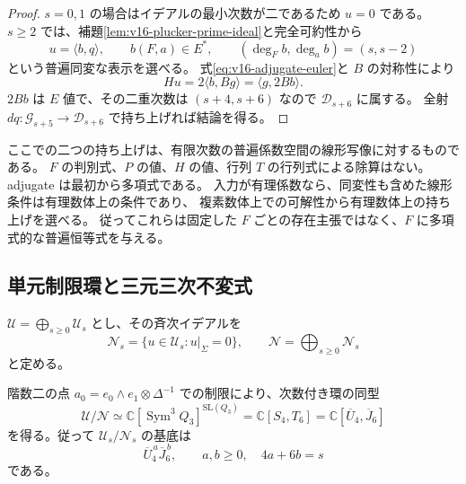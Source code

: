 \begin{proof}
$s=0,1$ の場合はイデアルの最小次数が二であるため $u=0$ である。
$s\ge2$ では、補題\ref{lem:v16-plucker-prime-ideal}と完全可約性から
\[
 u=\langle b,q\rangle,\qquad b(F,a)\in E^*,\qquad
 (\deg_Fb,\deg_ab)=(s,s-2)
\]
という普遍同変な表示を選べる。
式\eqref{eq:v16-adjugate-euler}と $B$ の対称性により
\[
 Hu=2\langle b,Bg\rangle=\langle g,2Bb\rangle.
\]
$2Bb$ は $E$ 値で、その二重次数は $(s+4,s+6)$ なので
$\mathcal D_{s+6}$ に属する。
全射 $dq:\mathcal G_{s+5}\to\mathcal D_{s+6}$ で持ち上げれば結論を得る。
\end{proof}

\begin{remark}[持ち上げの代数性と有理性]
ここでの二つの持ち上げは、有限次数の普遍係数空間の線形写像に対するものである。
$F$ の判別式、$P$ の値、$H$ の値、行列 $T$ の行列式による除算はない。
adjugate は最初から多項式である。
入力が有理係数なら、同変性も含めた線形条件は有理数体上の条件であり、
複素数体上での可解性から有理数体上の持ち上げを選べる。
従ってこれらは固定した $F$ ごとの存在主張ではなく、$F$ に多項式的な普遍恒等式を与える。
\end{remark}

\subsection{単元制限環と三元三次不変式}

$\mathcal U=\bigoplus_{s\ge0}\mathcal U_s$ とし、その斉次イデアルを
\[
 \mathcal N_s=\{u\in\mathcal U_s:u|_\Sigma=0\},\qquad
 \mathcal N=\bigoplus_{s\ge0}\mathcal N_s
\]
と定める。

\begin{theorem}
\label{thm:v16-unit-restriction-ring}
階数二の点 $a_0=e_0\wedge e_1\otimes\Delta^{-1}$ での制限により、次数付き環の同型
\begin{equation}\label{eq:v16-unit-restriction-ring}
 \mathcal U/\mathcal N
 \simeq\mathbb C[\operatorname{Sym}^3Q_3]^{\mathrm{SL}(Q_3)}
 =\mathbb C[S_4,T_6]
 =\mathbb C[\overline U_4,\overline J_6]
\end{equation}
を得る。従って $\mathcal U_s/\mathcal N_s$ の基底は
\[
 \overline U_4^{\,a}\overline J_6^{\,b},\qquad
 a,b\ge0,\quad 4a+6b=s
\]
である。
\end{theorem}


